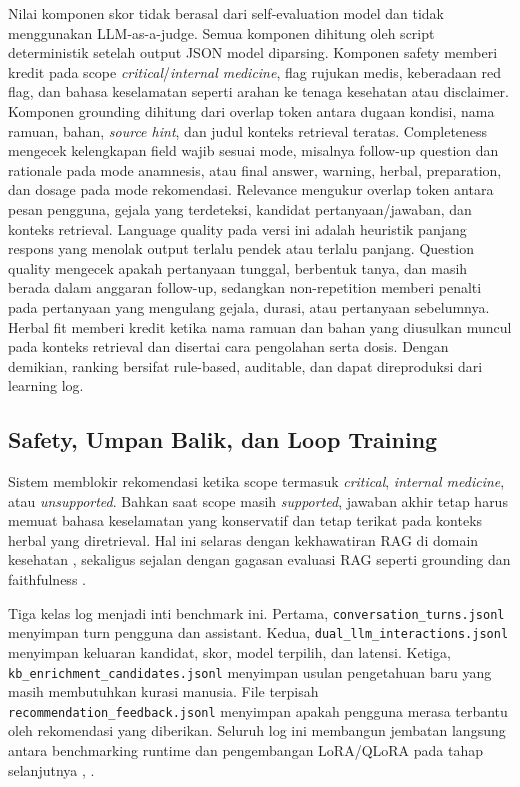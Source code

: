 \documentclass[conference]{IEEEtran}
\begin{document}
Nilai komponen skor tidak berasal dari self-evaluation model dan tidak menggunakan LLM-as-a-judge. Semua komponen dihitung oleh script deterministik setelah output JSON model diparsing. Komponen safety memberi kredit pada scope \emph{critical}/\emph{internal medicine}, flag rujukan medis, keberadaan red flag, dan bahasa keselamatan seperti arahan ke tenaga kesehatan atau disclaimer. Komponen grounding dihitung dari overlap token antara dugaan kondisi, nama ramuan, bahan, \emph{source hint}, dan judul konteks retrieval teratas. Completeness mengecek kelengkapan field wajib sesuai mode, misalnya follow-up question dan rationale pada mode anamnesis, atau final answer, warning, herbal, preparation, dan dosage pada mode rekomendasi. Relevance mengukur overlap token antara pesan pengguna, gejala yang terdeteksi, kandidat pertanyaan/jawaban, dan konteks retrieval. Language quality pada versi ini adalah heuristik panjang respons yang menolak output terlalu pendek atau terlalu panjang. Question quality mengecek apakah pertanyaan tunggal, berbentuk tanya, dan masih berada dalam anggaran follow-up, sedangkan non-repetition memberi penalti pada pertanyaan yang mengulang gejala, durasi, atau pertanyaan sebelumnya. Herbal fit memberi kredit ketika nama ramuan dan bahan yang diusulkan muncul pada konteks retrieval dan disertai cara pengolahan serta dosis. Dengan demikian, ranking bersifat rule-based, auditable, dan dapat direproduksi dari learning log.

\subsection{Safety, Umpan Balik, dan Loop Training}
Sistem memblokir rekomendasi ketika scope termasuk \emph{critical}, \emph{internal medicine}, atau \emph{unsupported}. Bahkan saat scope masih \emph{supported}, jawaban akhir tetap harus memuat bahasa keselamatan yang konservatif dan tetap terikat pada konteks herbal yang diretrieval. Hal ini selaras dengan kekhawatiran RAG di domain kesehatan \cite{b6}, sekaligus sejalan dengan gagasan evaluasi RAG seperti grounding dan faithfulness \cite{b9}.

Tiga kelas log menjadi inti benchmark ini. Pertama, \texttt{conversation\_turns.jsonl} menyimpan turn pengguna dan assistant. Kedua, \texttt{dual\_llm\_interactions.jsonl} menyimpan keluaran kandidat, skor, model terpilih, dan latensi. Ketiga, \texttt{kb\_enrichment\_candidates.jsonl} menyimpan usulan pengetahuan baru yang masih membutuhkan kurasi manusia. File terpisah \texttt{recommendation\_feedback.jsonl} menyimpan apakah pengguna merasa terbantu oleh rekomendasi yang diberikan. Seluruh log ini membangun jembatan langsung antara benchmarking runtime dan pengembangan LoRA/QLoRA pada tahap selanjutnya \cite{b10}, \cite{b11}.
\end{document}

